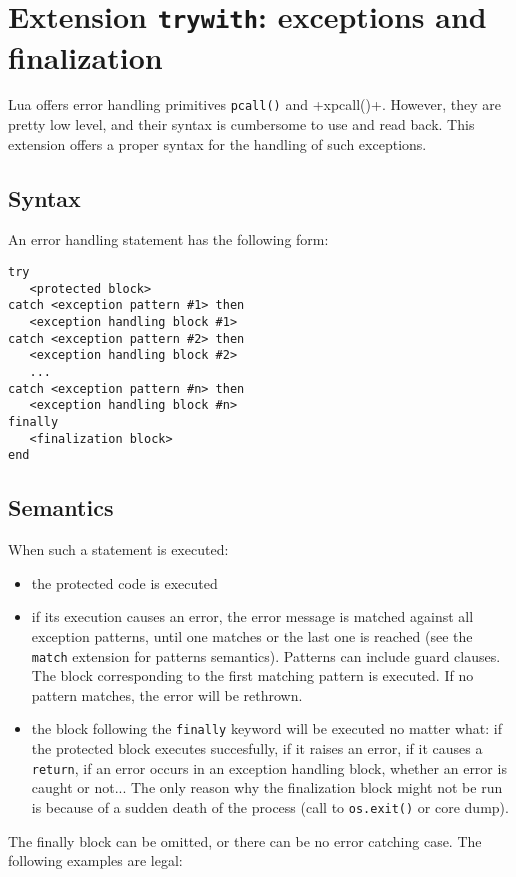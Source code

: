 \section{Extension {\tt trywith}: exceptions and finalization}
Lua offers error handling primitives \verb+pcall()+ and
\veb+xpcall()+. However, they are pretty low level, and their syntax
is cumbersome to use and read back. This extension offers a proper
syntax for the handling of such exceptions.

\subsection{Syntax}
An error handling statement has the following form:

\begin{verbatim}
try
   <protected block>
catch <exception pattern #1> then
   <exception handling block #1>
catch <exception pattern #2> then
   <exception handling block #2>
   ...
catch <exception pattern #n> then
   <exception handling block #n>
finally
   <finalization block>
end
\end{verbatim}

\subsection{Semantics}
When such a statement is executed:
\begin{itemize}
\item the protected code is executed
\item if its execution causes an error, the error message is matched
  against all exception patterns, until one matches or the last one is
  reached (see the \verb+match+ extension for patterns
  semantics). Patterns can include guard clauses. The block
  corresponding to the first matching pattern is executed. If no
  pattern matches, the error will be rethrown.
\item the block following the \verb+finally+ keyword will be executed
  no matter what: if the protected block executes succesfully, if it
  raises an error, if it causes a \verb+return+, if an error occurs in
  an exception handling block, whether an error is caught or
  not... The only reason why the finalization block might not be run
  is because of a sudden death of the process (call to {\tt os.exit()}
  or core dump).
\end{itemize}

The finally block can be omitted, or there can be no error catching
case. The following examples are legal:

